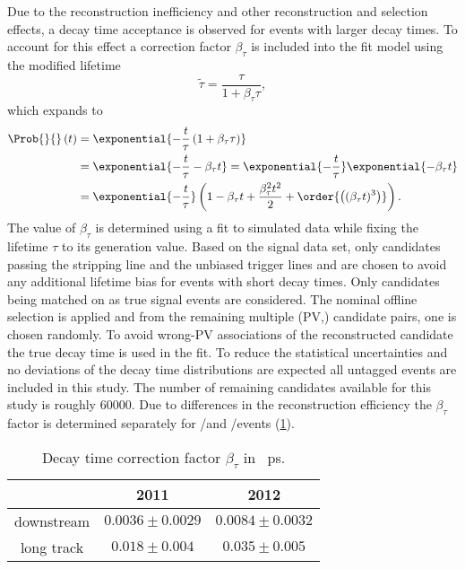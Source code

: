 Due to the \VELO reconstruction inefficiency and other reconstruction and selection effects, a decay time
acceptance is observed for events with larger decay times. To account for
this effect a correction factor $\beta_\tau$ is included into the fit model
using the modified lifetime
%
\begin{equation}
  \widetilde{\tau} = \frac{\tau}{1 + \beta_\tau \tau} ,
\end{equation}
%
which expands to
%
\begin{equation}\label{eq:measurement_of_sin2beta:resolution_and_acceptance:acceptance:upper:linear}
\begin{split}
  \Prob{}{}\left(t\right) &= \exponential{-\frac{t}{\tau}\left(1+\beta_{\tau}\tau\right)} \\
                          &= \exponential{-\frac{t}{\tau}-\beta_{\tau}t} = \exponential{-\frac{t}{\tau}} \exponential{-\beta_{\tau}t} \\
                          &= \exponential{-\frac{t}{\tau}}\left(1-\beta_{\tau} t+\frac{\beta_{\tau}^2 t^2}{2}+\order{\left((\beta_{\tau} t)^3\right)}\right).
\end{split}
\end{equation}
%
The value of $\beta_\tau$ is determined using a fit to simulated data while
fixing the lifetime $\tau$ to its generation value. Based on the
\BdToJpsiKS signal \MC data set, only candidates passing the
\StrippingPrescaled stripping line and the unbiased trigger lines
\HLTOneDiMuonHighMass and \HLTTwoDiMuonJpsi are chosen to avoid any
additional lifetime bias for events with short decay times. Only candidates
being matched on \MC as true signal events are considered. The nominal offline
selection is applied and from the remaining multiple (\acs{PV},\Bd) candidate pairs,
one is chosen randomly. To avoid wrong-\acs{PV} associations of the reconstructed
\BdToJpsiKS candidate the true \MC decay time is used in the fit. To reduce the
statistical uncertainties and no deviations of the decay time distributions are
expected all untagged events are included in this study. The number of remaining
\MC candidates available for this study is roughly \num{60000}. Due to
differences in the reconstruction efficiency the $\beta_\tau$ factor is
determined separately for \catOO/\catOT and \catDD/\catLL events
(\cref{tab:measurement_of_sin2beta:resolution_and_acceptance:acceptance:upper}).
%
\begin{table}
  \centering
  \caption{Decay time correction factor $\beta_\tau$ in \si{\per\pico\second}.}
  \begin{tabular}{ccc}
    \toprule
     & 2011 & 2012 \\
    \midrule
    downstream & $0.0036\pm0.0029$ & $0.0084\pm0.0032$ \\
    long track & $0.018\pm0.004$   & $0.035\pm0.005$ \\
    \bottomrule
  \end{tabular}
  \label{tab:measurement_of_sin2beta:resolution_and_acceptance:acceptance:upper}
\end{table}

